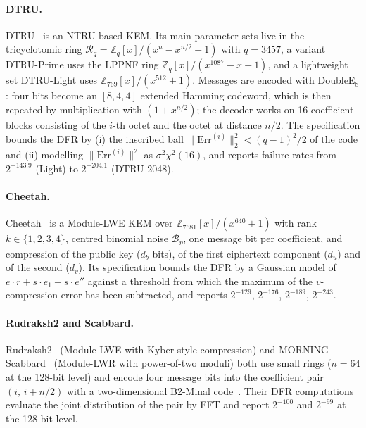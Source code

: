 \documentclass[11pt,a4paper]{article}
\theoremstyle{definition}
\theoremstyle{remark}
\newcommand{\Err}{\mathrm{Err}}
\newcommand{\Z}{\mathbb{Z}}
\newcommand{\R}{\mathcal{R}}
\newcommand{\CBD}{\mathcal{B}}
\begin{document}
\paragraph{DTRU.}
DTRU~\cite{DTRU} is an NTRU-based KEM. Its main parameter sets live in the
tricyclotomic ring $\R_q=\Z_q[x]/(x^n-x^{n/2}+1)$ with $q=3457$, a variant
DTRU-Prime uses the LPPNF ring $\Z_q[x]/(x^{1087}-x-1)$, and a lightweight
set DTRU-Light uses $\Z_{769}[x]/(x^{512}+1)$. Messages are encoded with
DoubleE$_8$: four bits become an $[8,4,4]$ extended Hamming codeword, which
is then repeated by multiplication with $(1+x^{n/2})$; the decoder works on
16-coefficient blocks consisting of the $i$-th octet and the octet at
distance $n/2$. The specification bounds the DFR by (i) the inscribed ball
$\|\Err^{(i)}\|_2^2<(q-1)^2/2$ of the code and (ii) modelling
$\|\Err^{(i)}\|^2$ as $\sigma^2\chi^2(16)$, and reports failure rates from
$2^{-143.9}$ (Light) to $2^{-204.1}$ (DTRU-2048).

\paragraph{Cheetah.}
Cheetah~\cite{Cheetah} is a Module-LWE KEM over $\Z_{7681}[x]/(x^{640}+1)$
with rank $k\in\{1,2,3,4\}$, centred binomial noise $\CBD_\eta$, one message
bit per coefficient, and compression of the public key ($d_b$ bits), of the
first ciphertext component ($d_u$) and of the second ($d_v$). Its
specification bounds the DFR by a Gaussian model of
$e\cdot r+s\cdot e_1-s\cdot e''$ against a threshold from which the maximum of
the $v$-compression error has been subtracted, and reports $2^{-129}$,
$2^{-176}$, $2^{-189}$, $2^{-243}$.

\paragraph{Rudraksh2 and Scabbard.}
Rudraksh2~\cite{Rudraksh2} (Module-LWE with Kyber-style compression) and
MORNING-Scabbard~\cite{Scabbard} (Module-LWR with power-of-two moduli) both
use small rings ($n=64$ at the 128-bit level) and encode four message bits
into the coefficient pair $(i,\,i+n/2)$ with a two-dimensional B2-Minal
code~\cite{Minal}. Their DFR computations evaluate the joint distribution
of the pair by FFT and report $2^{-100}$ and $2^{-99}$ at the 128-bit
level.
\end{document}
